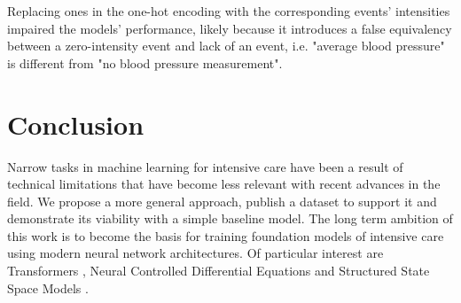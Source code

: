 Replacing ones in the one-hot encoding with the corresponding events' intensities impaired the models' performance, likely because it introduces a false equivalency between a zero-intensity event and lack of an event, i.e. "average blood pressure" is different from "no blood pressure measurement".



\newpage
\section{Conclusion}

Narrow tasks in machine learning for intensive care have been a result of technical limitations that have become less relevant with recent advances in the field. 
We propose a more general approach, publish a dataset to support it and demonstrate its viability with a simple baseline model.
The long term ambition of this work is to become the basis for training foundation models of intensive care using modern neural network architectures.
Of particular interest are Transformers \cite{vaswaniAttentionAllYou2023}, Neural Controlled Differential Equations \cite{kidgerNeuralControlledDifferential2020} and Structured State Space Models \cite{guEfficientlyModelingLong2022}.